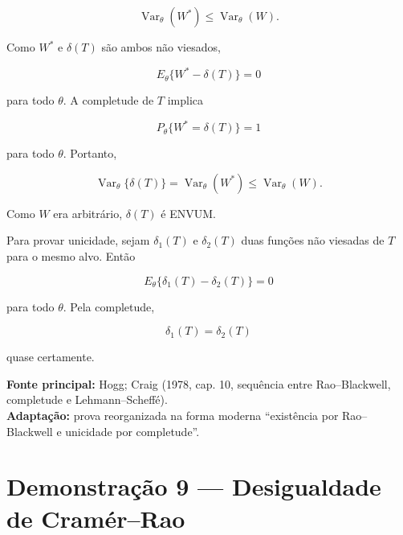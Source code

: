 \documentclass[
  letterpaper,
  DIV=11,
  numbers=noendperiod]{scrreprt}
\begin{document}
\[
\operatorname{Var}_\theta(W^*)
\leq
\operatorname{Var}_\theta(W).
\]

Como \(W^*\) e \(\delta(T)\) são ambos não viesados,

\[
E_\theta\{W^*-\delta(T)\}=0
\]

para todo \(\theta\). A completude de \(T\) implica

\[
P_\theta\{W^*=\delta(T)\}=1
\]

para todo \(\theta\). Portanto,

\[
\operatorname{Var}_\theta\{\delta(T)\}
=
\operatorname{Var}_\theta(W^*)
\leq
\operatorname{Var}_\theta(W).
\]

Como \(W\) era arbitrário, \(\delta(T)\) é ENVUM.

Para provar unicidade, sejam \(\delta_1(T)\) e \(\delta_2(T)\) duas
funções não viesadas de \(T\) para o mesmo alvo. Então

\[
E_\theta\{\delta_1(T)-\delta_2(T)\}=0
\]

para todo \(\theta\). Pela completude,

\[
\delta_1(T)=\delta_2(T)
\]

quase certamente.

\begin{tcolorbox}[enhanced jigsaw, colback=white, leftrule=.75mm, colbacktitle=quarto-callout-note-color!10!white, breakable, titlerule=0mm, bottomtitle=1mm, title=\textcolor{quarto-callout-note-color}{\faInfo}\hspace{0.5em}{Fonte da demonstração}, colframe=quarto-callout-note-color-frame, toprule=.15mm, opacityback=0, bottomrule=.15mm, opacitybacktitle=0.6, arc=.35mm, toptitle=1mm, rightrule=.15mm, coltitle=black, left=2mm]

\textbf{Fonte principal:} Hogg; Craig (1978, cap. 10, sequência entre
Rao--Blackwell, completude e Lehmann--Scheffé).\\
\textbf{Adaptação:} prova reorganizada na forma moderna ``existência por
Rao--Blackwell e unicidade por completude''.

\end{tcolorbox}

\section*{Demonstração 9 --- Desigualdade de
Cramér--Rao}\label{demonstrauxe7uxe3o-9-desigualdade-de-cramuxe9rrao}

\end{document}
